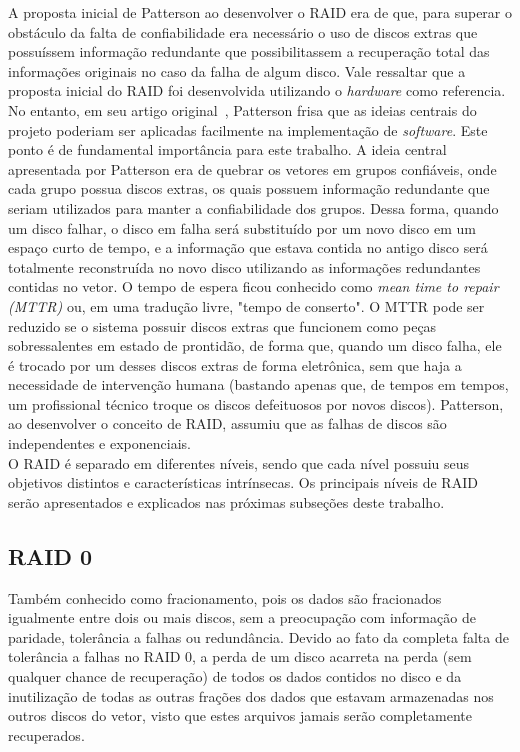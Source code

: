 A proposta inicial de Patterson ao desenvolver o RAID era de que, para superar o obstáculo da falta de confiabilidade era necessário o uso de discos extras que possuíssem informação redundante que possibilitassem a recuperação total das informações originais no caso da falha de algum disco. Vale ressaltar que a proposta inicial do RAID foi desenvolvida utilizando o \textit{hardware} como referencia. No entanto, em seu artigo original~\cite{patterson88}, Patterson frisa que as ideias centrais do projeto poderiam ser aplicadas facilmente na implementação de \textit{software}. Este ponto é de fundamental importância para este trabalho. A ideia central apresentada por Patterson era de quebrar os vetores em grupos confiáveis, onde cada grupo possua discos extras, os quais possuem informação redundante que seriam utilizados para manter a confiabilidade dos grupos. Dessa forma, quando um disco falhar, o disco em falha será substituído por um novo disco em um espaço curto de tempo,  e a informação que estava contida no antigo disco será totalmente reconstruída no novo disco utilizando as informações redundantes contidas no vetor. O tempo de espera ficou conhecido como \textit{mean time to repair (MTTR)} ou, em uma tradução livre, "tempo de conserto". O MTTR pode ser reduzido se o sistema possuir discos extras que funcionem como peças sobressalentes em estado de prontidão, de forma que, quando um disco falha, ele é trocado por um desses discos extras de forma eletrônica, sem que haja a necessidade de intervenção humana (bastando apenas que, de tempos em tempos, um profissional técnico troque os discos defeituosos por novos discos). Patterson, ao desenvolver o conceito de RAID, assumiu que as falhas de discos são independentes e exponenciais. \\

O RAID é separado em diferentes níveis, sendo que cada nível possuiu seus objetivos distintos e características intrínsecas. Os principais níveis de RAID serão apresentados e explicados nas próximas subseções deste trabalho.
\\

\subsection{RAID 0}

Também conhecido como fracionamento, pois os dados são fracionados igualmente entre dois ou mais discos, sem a preocupação com informação de paridade, tolerância a falhas ou redundância. Devido ao fato da completa falta de tolerância a falhas no RAID 0, a perda de um disco acarreta na perda (sem qualquer chance de recuperação) de todos os dados contidos no disco e da inutilização de todas as outras frações dos dados que estavam armazenadas nos outros discos do vetor, visto que estes arquivos jamais serão completamente recuperados.
\\

